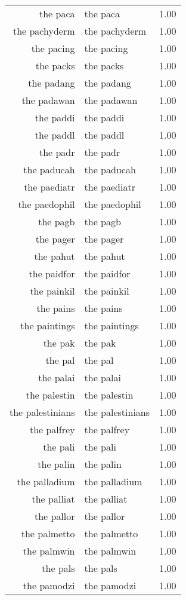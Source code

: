 \begin{table}[ht]
\begin{tabular}{rlr}
  the paca & the paca & 1.00 \\ 
  the pachyderm & the pachyderm & 1.00 \\ 
  the pacing & the pacing & 1.00 \\ 
  the packs & the packs & 1.00 \\ 
  the padang & the padang & 1.00 \\ 
  the padawan & the padawan & 1.00 \\ 
  the paddi & the paddi & 1.00 \\ 
  the paddl & the paddl & 1.00 \\ 
  the padr & the padr & 1.00 \\ 
  the paducah & the paducah & 1.00 \\ 
  the paediatr & the paediatr & 1.00 \\ 
  the paedophil & the paedophil & 1.00 \\ 
  the pagb & the pagb & 1.00 \\ 
  the pager & the pager & 1.00 \\ 
  the pahut & the pahut & 1.00 \\ 
  the paidfor & the paidfor & 1.00 \\ 
  the painkil & the painkil & 1.00 \\ 
  the pains & the pains & 1.00 \\ 
  the paintings & the paintings & 1.00 \\ 
  the pak & the pak & 1.00 \\ 
  the pal & the pal & 1.00 \\ 
  the palai & the palai & 1.00 \\ 
  the palestin & the palestin & 1.00 \\ 
  the palestinians & the palestinians & 1.00 \\ 
  the palfrey & the palfrey & 1.00 \\ 
  the pali & the pali & 1.00 \\ 
  the palin & the palin & 1.00 \\ 
  the palladium & the palladium & 1.00 \\ 
  the palliat & the palliat & 1.00 \\ 
  the pallor & the pallor & 1.00 \\ 
  the palmetto & the palmetto & 1.00 \\ 
  the palmwin & the palmwin & 1.00 \\ 
  the pals & the pals & 1.00 \\ 
  the pamodzi & the pamodzi & 1.00 \\ 

\end{tabular}
\end{table}
